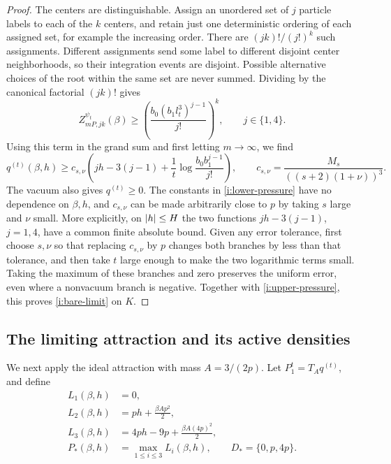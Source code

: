 \begin{proof}
The centers are distinguishable.  Assign an unordered set of \(j\)
particle labels to each of the \(k\) centers, and retain just one
deterministic ordering of each assigned set, for example the increasing
order.  There are \((jk)!/(j!)^k\) such assignments.  Different
assignments send some label to different disjoint center neighborhoods,
so their integration events are disjoint.  Possible alternative choices
of the root within the same set are never summed.  Dividing by the
canonical factorial \((jk)!\) gives
\begin{equation}
 Z^{\psi_t}_{mP,jk}(\beta)
 \ge\left(\frac{b_0(b_1l_t^3)^{j-1}}{j!}\right)^k,
 \qquad j\in\{1,4\}.
 \label{i:cluster-lower}
\end{equation}
Using this term in the grand sum and first letting \(m\to\infty\), we
find
\begin{equation}
 q^{(t)}(\beta,h)
 \ge c_{s,\nu}\left(jh-3(j-1)
       +\frac1t\log\frac{b_0b_1^{j-1}}{j!}\right),
 \qquad
 c_{s,\nu}=\frac{M_s}{((s+2)(1+\nu))^3}.
 \label{i:lower-pressure}
\end{equation}
The vacuum also gives \(q^{(t)}\ge0\).  The constants in
\eqref{i:lower-pressure} have no dependence on \(\beta,h\), and
\(c_{s,\nu}\) can be made arbitrarily close to \(p\) by taking \(s\)
large and \(\nu\) small.  More explicitly, on \(\left|h\right|\le H\) the
two functions \(jh-3(j-1)\), \(j=1,4\), have a common finite absolute
bound.  Given any error tolerance, first choose \(s,\nu\) so that
replacing \(c_{s,\nu}\) by \(p\) changes both branches by less than
that tolerance, and then take \(t\) large enough to make the two
logarithmic terms small.  Taking the maximum of these branches and zero
preserves the uniform error, even where a nonvacuum branch is negative.
Together with \eqref{i:upper-pressure}, this proves
\eqref{i:bare-limit} on \(K\).
\end{proof}

\subsection{The limiting attraction and its active densities}

We next apply the ideal attraction with mass \(A=3/(2p)\).  Let
\(P_1^t=T_Aq^{(t)}\), and define
\begin{equation}
 \begin{split}
 L_1(\beta,h)&=0,\\
 L_2(\beta,h)&=ph+\frac{\beta A p^2}{2},\\
 L_3(\beta,h)&=4ph-9p+\frac{\beta A(4p)^2}{2},\\
 P_*(\beta,h)&=\max_{1\le i\le3}L_i(\beta,h),
 \qquad D_*=\{0,p,4p\}.
 \end{split}
 \label{i:three-planes}
\end{equation}

